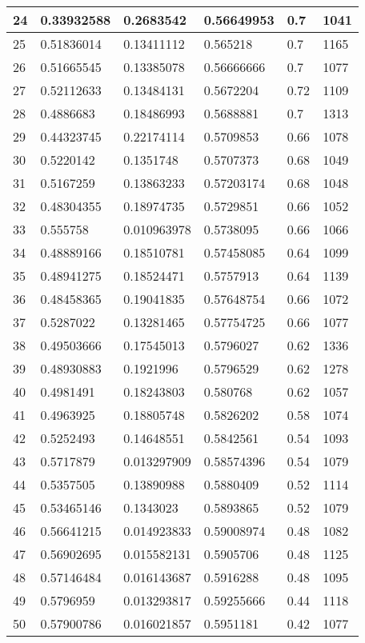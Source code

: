 \begin{longtable}{|l|l|l|l|l|l|}
24 & 0.33932588 & 0.2683542 & 0.56649953 & 0.7 & 1041 \\ \hline 
25 & 0.51836014 & 0.13411112 & 0.565218 & 0.7 & 1165 \\ \hline 
26 & 0.51665545 & 0.13385078 & 0.56666666 & 0.7 & 1077 \\ \hline 
27 & 0.52112633 & 0.13484131 & 0.5672204 & 0.72 & 1109 \\ \hline 
28 & 0.4886683 & 0.18486993 & 0.5688881 & 0.7 & 1313 \\ \hline 
29 & 0.44323745 & 0.22174114 & 0.5709853 & 0.66 & 1078 \\ \hline 
30 & 0.5220142 & 0.1351748 & 0.5707373 & 0.68 & 1049 \\ \hline 
31 & 0.5167259 & 0.13863233 & 0.57203174 & 0.68 & 1048 \\ \hline 
32 & 0.48304355 & 0.18974735 & 0.5729851 & 0.66 & 1052 \\ \hline 
33 & 0.555758 & 0.010963978 & 0.5738095 & 0.66 & 1066 \\ \hline 
34 & 0.48889166 & 0.18510781 & 0.57458085 & 0.64 & 1099 \\ \hline 
35 & 0.48941275 & 0.18524471 & 0.5757913 & 0.64 & 1139 \\ \hline 
36 & 0.48458365 & 0.19041835 & 0.57648754 & 0.66 & 1072 \\ \hline 
37 & 0.5287022 & 0.13281465 & 0.57754725 & 0.66 & 1077 \\ \hline 
38 & 0.49503666 & 0.17545013 & 0.5796027 & 0.62 & 1336 \\ \hline 
39 & 0.48930883 & 0.1921996 & 0.5796529 & 0.62 & 1278 \\ \hline 
40 & 0.4981491 & 0.18243803 & 0.580768 & 0.62 & 1057 \\ \hline 
41 & 0.4963925 & 0.18805748 & 0.5826202 & 0.58 & 1074 \\ \hline 
42 & 0.5252493 & 0.14648551 & 0.5842561 & 0.54 & 1093 \\ \hline 
43 & 0.5717879 & 0.013297909 & 0.58574396 & 0.54 & 1079 \\ \hline 
44 & 0.5357505 & 0.13890988 & 0.5880409 & 0.52 & 1114 \\ \hline 
45 & 0.53465146 & 0.1343023 & 0.5893865 & 0.52 & 1079 \\ \hline 
46 & 0.56641215 & 0.014923833 & 0.59008974 & 0.48 & 1082 \\ \hline 
47 & 0.56902695 & 0.015582131 & 0.5905706 & 0.48 & 1125 \\ \hline 
48 & 0.57146484 & 0.016143687 & 0.5916288 & 0.48 & 1095 \\ \hline 
49 & 0.5796959 & 0.013293817 & 0.59255666 & 0.44 & 1118 \\ \hline 
50 & 0.57900786 & 0.016021857 & 0.5951181 & 0.42 & 1077 \\ \hline 
\end{longtable}